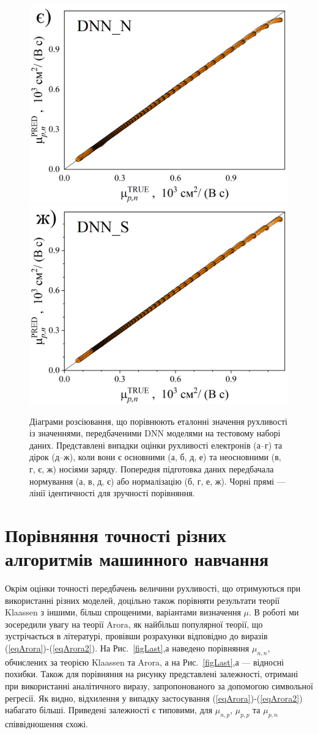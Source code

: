\documentclass[12pt,a4paper,titlepage,oneside]{book}
\numberwithin{equation}{part}
\begin{document}
\begin{figure}
     \includegraphics[width=0.35\linewidth]{DNNNpn.png}\kern 20pt
     \includegraphics[width=0.35\linewidth]{DNNSpn.png}
	  \caption{Діаграми розсіювання, що порівнюють еталонні значення рухливості із значеннями, передбаченими DNN моделями
       на тестовому наборі даних.
       Представлені випадки оцінки рухливості електронів (а--г) та дірок (д--ж), коли вони є
       основними (а, б, д, е) та неосновними (в, г, є, ж) носіями заряду.
       Попередня підготовка даних передбачала нормування (а, в, д, є) або нормалізацію (б, г, е, ж).
       Чорні прямі --- лінії ідентичності для зручності порівняння.
}\label{figDNN}
\end{figure}



\section{Порівняння точності різних алгоритмів машинного навчання}

Окрім оцінки точності передбачень величини рухливості, що отримуються при використанні різних моделей,
доцільно також порівняти результати теорії Klaassen з іншими, більш спрощеними, варіантами визначення $\mu$.
В роботі ми зосередили увагу на теорії Arora, як найбільш популярної теорії, що зустрічається в літературі,
провівши розрахунки відповідно до виразів (\ref{eqArora})-(\ref{eqArora2}).
На Рис.~\ref{figLast},а наведено порівняння $\mu_{n,n}$, обчислених за теорією  Klaassen та Arora,
а на Рис.~\ref{figLast},а --- відносні похибки.
Також для порівняння на рисунку представлені залежності, отримані при використанні
аналітичного виразу, запропонованого за допомогою символьної регресії.
Як видно, відхилення у випадку застосування (\ref{eqArora})-(\ref{eqArora2}) набагато більші.
Приведені залежності є типовими, для $\mu_{n,p}$, $\mu_{p,p}$ та $\mu_{p,n}$ співвідношення схожі.
\end{document}
